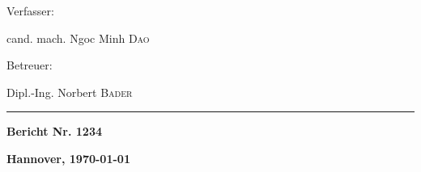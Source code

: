 \vfill

\begin{minipage}[t]{0.5\textwidth}
    \begin{flushleft}
        Verfasser:

        cand. mach. Ngoc Minh \textsc{Dao}
    \end{flushleft}
\end{minipage}
%
\begin{minipage}[t]{0.5\textwidth}
    \begin{flushright}
        Betreuer:

        Dipl.-Ing. Norbert \textsc{Bader}
    \end{flushright}
\end{minipage}

\rule{\textwidth}{1pt}

\begin{minipage}[t]{0.5\textwidth}
    \begin{flushleft}
        \textbf{Bericht Nr. 1234}
    \end{flushleft}
\end{minipage}
%
\begin{minipage}[t]{0.5\textwidth}
    \begin{flushright}
        \textbf{Hannover, \today}
    \end{flushright}
\end{minipage}

